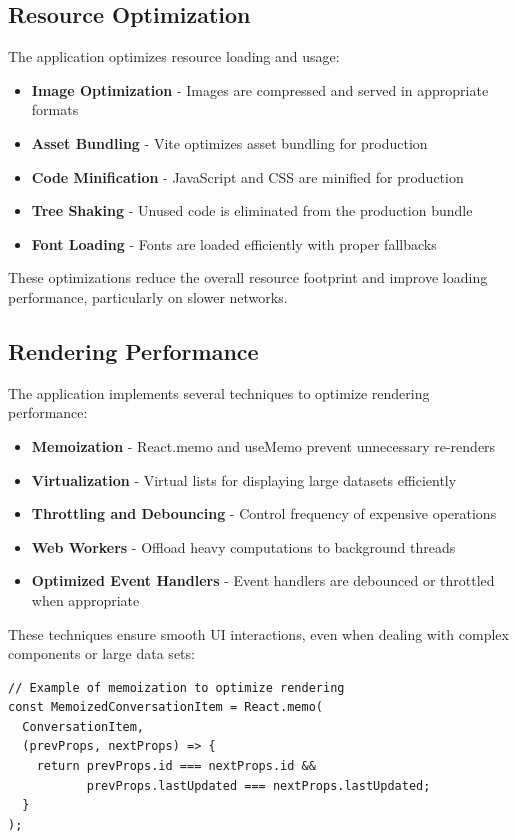 \subsection{Resource Optimization}

The application optimizes resource loading and usage:

\begin{itemize}
  \item \textbf{Image Optimization} - Images are compressed and served in appropriate formats
  \item \textbf{Asset Bundling} - Vite optimizes asset bundling for production
  \item \textbf{Code Minification} - JavaScript and CSS are minified for production
  \item \textbf{Tree Shaking} - Unused code is eliminated from the production bundle
  \item \textbf{Font Loading} - Fonts are loaded efficiently with proper fallbacks
\end{itemize}

These optimizations reduce the overall resource footprint and improve loading performance, particularly on slower networks.

\subsection{Rendering Performance}

The application implements several techniques to optimize rendering performance:

\begin{itemize}
  \item \textbf{Memoization} - React.memo and useMemo prevent unnecessary re-renders
  \item \textbf{Virtualization} - Virtual lists for displaying large datasets efficiently
  \item \textbf{Throttling and Debouncing} - Control frequency of expensive operations
  \item \textbf{Web Workers} - Offload heavy computations to background threads
  \item \textbf{Optimized Event Handlers} - Event handlers are debounced or throttled when appropriate
\end{itemize}

These techniques ensure smooth UI interactions, even when dealing with complex components or large data sets:

\begin{verbatim}
// Example of memoization to optimize rendering
const MemoizedConversationItem = React.memo(
  ConversationItem, 
  (prevProps, nextProps) => {
    return prevProps.id === nextProps.id && 
           prevProps.lastUpdated === nextProps.lastUpdated;
  }
);
\end{verbatim}

